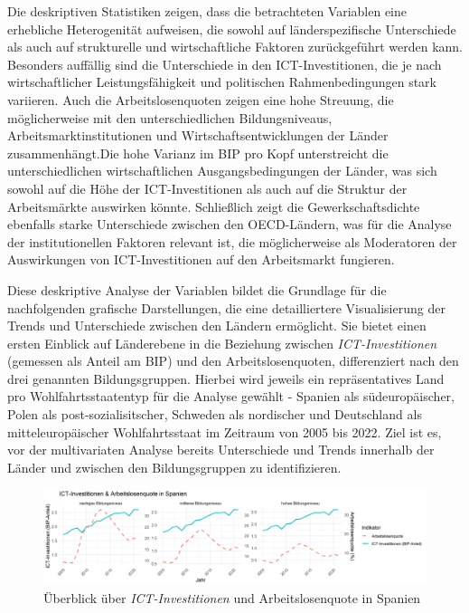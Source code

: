 Die deskriptiven Statistiken zeigen, dass die betrachteten Variablen eine erhebliche 
Heterogenität aufweisen, die sowohl auf länderspezifische Unterschiede als auch auf 
strukturelle und wirtschaftliche Faktoren zurückgeführt werden kann. Besonders auffällig 
sind die Unterschiede in den \ac{ICT}-Investitionen, die je nach wirtschaftlicher 
Leistungsfähigkeit und politischen Rahmenbedingungen stark variieren. Auch die 
Arbeitslosenquoten zeigen eine hohe Streuung, die möglicherweise mit den unterschiedlichen 
Bildungsniveaus, Arbeitsmarktinstitutionen und Wirtschaftsentwicklungen der Länder 
zusammenhängt.Die hohe Varianz im \ac{BIP} pro Kopf unterstreicht die unterschiedlichen 
wirtschaftlichen Ausgangsbedingungen der Länder, was sich sowohl auf die Höhe der 
\ac{ICT}-Investitionen als auch auf die Struktur der Arbeitsmärkte auswirken könnte. 
Schließlich zeigt die Gewerkschaftsdichte ebenfalls starke Unterschiede zwischen den 
OECD-Ländern, was für die Analyse der institutionellen Faktoren relevant ist, die 
möglicherweise als Moderatoren der Auswirkungen von \ac{ICT}-Investitionen auf den 
Arbeitsmarkt fungieren.

Diese deskriptive Analyse der Variablen bildet die Grundlage für die nachfolgenden 
grafische Darstellungen, die eine detailliertere Visualisierung der Trends und Unterschiede 
zwischen den Ländern ermöglicht. Sie bietet einen ersten Einblick auf Länderebene in die 
Beziehung zwischen \textit{\ac{ICT}-Investitionen} (gemessen als Anteil am \ac{BIP}) und 
den Arbeitslosenquoten, differenziert nach den drei genannten Bildungsgruppen. Hierbei 
wird jeweils ein repräsentatives Land pro Wohlfahrtsstaatentyp für die Analyse gewählt - 
Spanien als südeuropäischer, Polen als post-sozialisitscher, Schweden als nordischer und 
Deutschland als mitteleuropäischer Wohlfahrtsstaat im Zeitraum von 2005 bis 2022. Ziel ist 
es, vor der multivariaten Analyse bereits Unterschiede und Trends innerhalb der Länder und 
zwischen den Bildungsgruppen zu identifizieren.

\begin{figure}[htbp]
    \centering
    \includegraphics[width=\textwidth]{assets/plot_spain.png}
    \caption{Überblick über \textit{\ac{ICT}-Investitionen} und Arbeitslosenquote in 
    Spanien}
    \label{fig:spain}
\end{figure}

